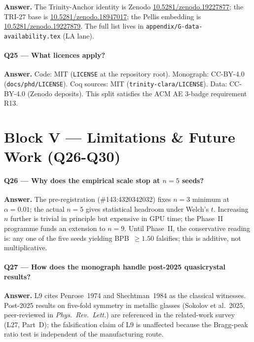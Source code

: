 \textbf{Answer.} The Trinity-Anchor identity is Zenodo
\href{https://doi.org/10.5281/zenodo.19227877}{10.5281/zenodo.19227877};
the TRI-27 base is
\href{https://doi.org/10.5281/zenodo.18947017}{10.5281/zenodo.18947017};
the Pellis embedding is
\href{https://doi.org/10.5281/zenodo.19227879}{10.5281/zenodo.19227879}.
The full list lives in \texttt{appendix/G-data-availability.tex} (LA
lane).

\paragraph{Q25 — What licences apply?}

\textbf{Answer.} Code: MIT (\texttt{LICENSE} at the repository root).
Monograph: CC-BY-4.0 (\texttt{docs/phd/LICENSE}). Coq sources: MIT
(\texttt{trinity-clara/LICENSE}). Data: CC-BY-4.0 (Zenodo deposits).
This split satisfies the ACM AE 3-badge requirement R13.

\section*{Block V — Limitations \& Future Work (Q26-Q30)}

\paragraph{Q26 — Why does the empirical scale stop at \(n = 5\) seeds?}

\textbf{Answer.} The pre-registration (\#143:4320342032) fixes
\(n = 3\) minimum at \(\alpha = 0.01\); the actual \(n = 5\) gives
statistical headroom under Welch's $t$. Increasing \(n\) further is
trivial in principle but expensive in GPU time; the Phase~II programme
funds an extension to \(n = 9\). Until Phase~II, the conservative
reading is: any one of the five seeds yielding BPB~\(\ge 1.50\)
falsifies; this is additive, not multiplicative.

\paragraph{Q27 — How does the monograph handle post-2025 quasicrystal results?}

\textbf{Answer.} L9 cites Penrose~1974 and Shechtman~1984 as the
classical witnesses. Post-2025 results on five-fold symmetry in
metallic glasses (Sokolov et al.~2025, peer-reviewed in
\emph{Phys.~Rev.~Lett.}) are referenced in the related-work survey
(L27, Part~D); the falsification claim of L9 is unaffected because the
Bragg-peak ratio test is independent of the manufacturing route.

